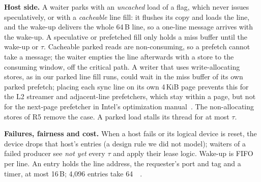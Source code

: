 \documentclass[journal]{IEEEtran}
\begin{document}
\textbf{Host side.} A waiter parks with an \emph{uncached} load of a flag, which never issues
speculatively, or with a \emph{cacheable} line fill: it flushes its copy and loads the line, and the
wake-up delivers the whole 64\,B line, so a one-line message arrives with the wake-up. A speculative
or prefetched fill only holds a miss buffer until the wake-up or $\tau$. Cacheable parked reads are
non-consuming, so a prefetch cannot take a message; the waiter empties the line afterwards with a
store to the consuming window, off the critical path. A writer that uses write-allocating stores, as
in our parked line fill runs, could wait in the miss buffer of its own parked prefetch; placing each
sync line on its own 4\,KiB page prevents this for the L2 streamer and adjacent-line prefetchers,
which stay within a page, but not for the next-page prefetcher in Intel's optimization manual~\cite{intelopt}. The
non-allocating stores of R5 remove the case. A parked load stalls its thread for at most $\tau$.

\textbf{Failures, fairness and cost.} When a host fails or its logical device is reset, the device
drops that host's entries (a design rule we did not model); waiters of a failed producer see
\emph{not yet} every $\tau$ and apply their lease logic. Wake-up is FIFO per line. An entry holds the
line address, the requester's port and tag and a timer, at most 16\,B; 4,096 entries take
\SI{64}{\kibi\byte}.
\end{document}
